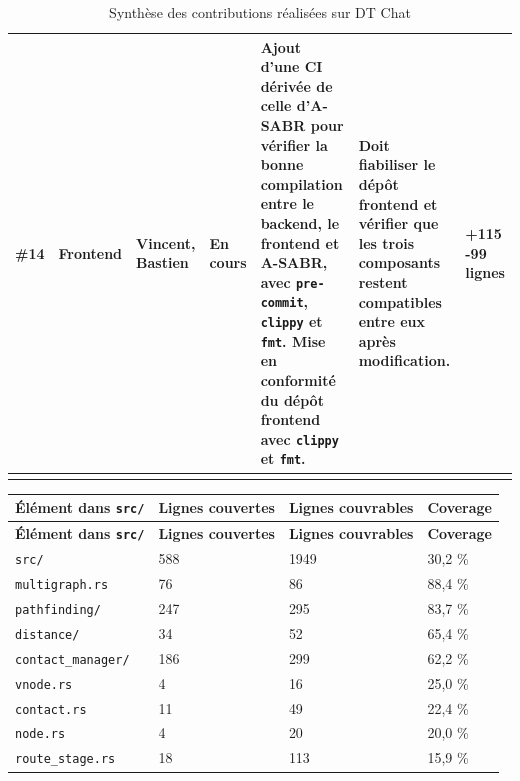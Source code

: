 \documentclass{article}
\begin{document}
\begin{center}
\begin{longtable}{|p{}|p{}|p{}|p{}|p{}|p{}|p{}|}
\#14 & Frontend & Vincent, Bastien & En cours
& Ajout d’une CI dérivée de celle d’A-SABR pour vérifier la bonne compilation entre le backend, le frontend et A-SABR, avec \texttt{pre-commit}, \texttt{clippy} et \texttt{fmt}. Mise en conformité du dépôt frontend avec \texttt{clippy} et \texttt{fmt}.
& Doit fiabiliser le dépôt frontend et vérifier que les trois composants restent compatibles entre eux après modification.
& +115 -99 lignes \\
\hline

\caption{Synthèse des contributions réalisées sur DT Chat}
\label{tab:contributions-dtchat}
\end{longtable}
\end{center}

\begin{center}
\footnotesize
\setlength{\tabcolsep}{3pt}
\renewcommand{\arraystretch}{1.2}

\begin{longtable}{|p{}|p{}|p{}|p{}|}
\hline
\textbf{Élément dans \texttt{src/}} & \textbf{Lignes couvertes} & \textbf{Lignes couvrables} & \textbf{Coverage} \\
\hline
\endfirsthead

\hline
\textbf{Élément dans \texttt{src/}} & \textbf{Lignes couvertes} & \textbf{Lignes couvrables} & \textbf{Coverage} \\
\hline
\endhead

\texttt{src/} & 588 & 1949 & 30,2 \% \\
\hline

\texttt{multigraph.rs} & 76 & 86 & 88,4 \% \\
\hline

\texttt{pathfinding/} & 247 & 295 & 83,7 \% \\
\hline

\texttt{distance/} & 34 & 52 & 65,4 \% \\
\hline

\texttt{contact\_manager/} & 186 & 299 & 62,2 \% \\
\hline

\texttt{vnode.rs} & 4 & 16 & 25,0 \% \\
\hline

\texttt{contact.rs} & 11 & 49 & 22,4 \% \\
\hline

\texttt{node.rs} & 4 & 20 & 20,0 \% \\
\hline

\texttt{route\_stage.rs} & 18 & 113 & 15,9 \% \\
\hline


\end{longtable}
\end{center}
\end{document}
